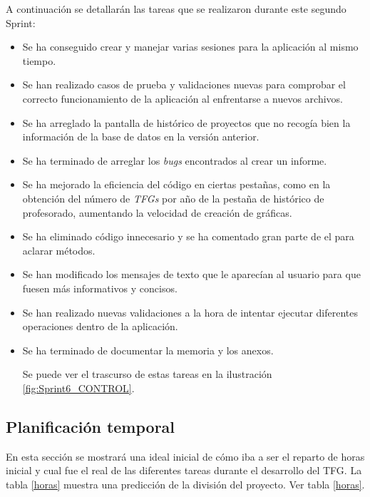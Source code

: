 A continuación se detallarán las tareas que se realizaron durante este segundo Sprint:
\begin{itemize}
	\item Se ha conseguido crear y manejar varias sesiones para la aplicación  al mismo tiempo.
	\item Se han realizado casos de prueba y validaciones nuevas para comprobar el correcto funcionamiento de la aplicación al enfrentarse a nuevos archivos.
	\item Se ha arreglado la pantalla de histórico de proyectos que no recogía bien la información de la base de datos en la versión anterior.
	\item Se ha terminado de arreglar los \emph{bugs} encontrados al crear un informe.
	\item Se ha mejorado la eficiencia del código en ciertas pestañas, como en la obtención del número de \emph{TFGs} por año de la pestaña de histórico de profesorado, aumentando la velocidad de creación de gráficas.
	\item Se ha eliminado código innecesario y se ha comentado gran parte de el para aclarar métodos.
	\item Se han modificado los mensajes de texto que le aparecían al usuario para que fuesen más informativos y concisos.
	\item Se han realizado nuevas validaciones a la hora de intentar ejecutar diferentes operaciones dentro de la aplicación.	
	\item Se ha terminado de documentar la memoria y los anexos.
	
	Se puede ver el trascurso de estas tareas en la ilustración \ref{fig:Sprint6_CONTROL}.
	
	
\end{itemize}	

\subsection{Planificación temporal}

En esta sección se mostrará una ideal inicial de cómo iba a ser el reparto de horas inicial y cual fue el real de las diferentes tareas durante el desarrollo del TFG. La tabla \ref{horas} muestra una predicción de la división del proyecto. Ver tabla \ref{horas}.

